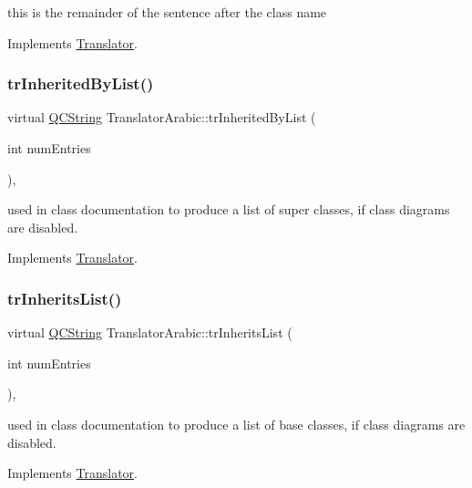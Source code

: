 this is the remainder of the sentence after the class name 

Implements \mbox{\hyperlink{class_translator}{Translator}}.

\mbox{\label{class_translator_arabic_a1f08fac4cb3e1a2956cf4646af2b1a01}} 
\subsubsection{\texorpdfstring{trInheritedByList()}{trInheritedByList()}}
{\footnotesize\ttfamily virtual \mbox{\hyperlink{class_q_c_string}{Q\+C\+String}} Translator\+Arabic\+::tr\+Inherited\+By\+List (\begin{DoxyParamCaption}\item[{int}]{num\+Entries }\end{DoxyParamCaption})\hspace{0.3cm}{\ttfamily [inline]}, {\ttfamily [virtual]}}

used in class documentation to produce a list of super classes, if class diagrams are disabled. 

Implements \mbox{\hyperlink{class_translator}{Translator}}.

\mbox{\label{class_translator_arabic_addbed4b78219a76378934b026c78e0cd}} 
\subsubsection{\texorpdfstring{trInheritsList()}{trInheritsList()}}
{\footnotesize\ttfamily virtual \mbox{\hyperlink{class_q_c_string}{Q\+C\+String}} Translator\+Arabic\+::tr\+Inherits\+List (\begin{DoxyParamCaption}\item[{int}]{num\+Entries }\end{DoxyParamCaption})\hspace{0.3cm}{\ttfamily [inline]}, {\ttfamily [virtual]}}

used in class documentation to produce a list of base classes, if class diagrams are disabled. 

Implements \mbox{\hyperlink{class_translator}{Translator}}.

